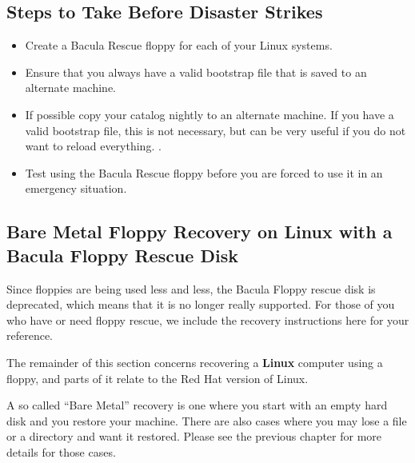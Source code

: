\label{steps}

\subsection*{Steps to Take Before Disaster Strikes}

\begin{itemize}
\item Create a Bacula Rescue floppy for each of your Linux systems.  
\item Ensure that you always have a valid bootstrap file that is  saved to an
   alternate machine.  
\item If possible copy your catalog nightly to an alternate machine.  If you
   have a valid bootstrap file, this is not necessary, but  can be very useful if
   you do not want to reload everything. .  
\item Test using the Bacula Rescue floppy before you are forced to use  it in
   an emergency situation. 
   \end{itemize}

\label{floppy}

\subsection*{Bare Metal Floppy Recovery on Linux with a Bacula Floppy Rescue
Disk}

Since floppies are being used less and less, the Bacula Floppy rescue disk is
deprecated, which means that it is no longer really supported. For those of
you who have or need floppy rescue, we include the recovery instructions here
for your reference. 

The remainder of this section concerns recovering a {\bf Linux} computer using
a floppy, and parts of it relate to the Red Hat version of Linux. 

A so called ``Bare Metal'' recovery is one where you start with an empty hard
disk and you restore your machine. There are also cases where you may lose a
file or a directory and want it restored. Please see the previous chapter for
more details for those cases. 

